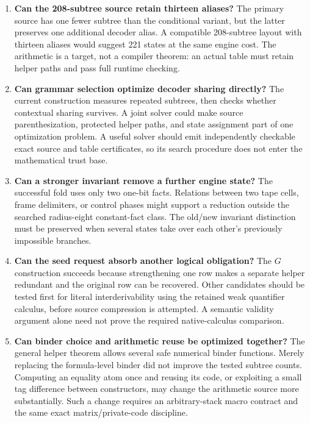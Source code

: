\begin{enumerate}
\item \textbf{Can the 208-subtree source retain thirteen aliases?}
The primary source has one fewer subtree than the conditional variant,
but the latter preserves one additional decoder alias. A compatible
208-subtree layout with thirteen aliases would suggest 221 states at
the same engine cost. The arithmetic is a target, not a compiler theorem:
an actual table must retain helper paths and pass full runtime checking.

\item \textbf{Can grammar selection optimize decoder sharing directly?}
The current construction measures repeated subtrees, then checks
whether contextual sharing survives. A joint solver could make source
parenthesization, protected helper paths, and state assignment part of
one optimization problem. A useful solver should emit independently
checkable exact source and table certificates, so its search procedure
does not enter the mathematical trust base.

\item \textbf{Can a stronger invariant remove a further engine state?}
The successful fold uses only two one-bit facts. Relations between
two tape cells, frame delimiters, or control phases might support a
reduction outside the searched radius-eight constant-fact class.
The old/new invariant distinction must be preserved when several
states take over each other's previously impossible branches.

\item \textbf{Can the seed request absorb another logical obligation?}
The $G$ construction succeeds because strengthening one row makes a
separate helper redundant and the original row can be recovered.
Other candidates should be tested first for literal interderivability
using the retained weak quantifier calculus, before source compression
is attempted. A semantic validity argument alone need not prove the
required native-calculus comparison.

\item \textbf{Can binder choice and arithmetic reuse be optimized together?}
The general helper theorem allows several safe numerical binder
functions. Merely replacing the formula-level binder did not improve
the tested subtree counts. Computing an equality atom once and reusing
its code, or exploiting a small tag difference between constructors,
may change the arithmetic source more substantially. Such a change
requires an arbitrary-stack macro contract and the same exact
matrix/private-code discipline.


\end{enumerate}
